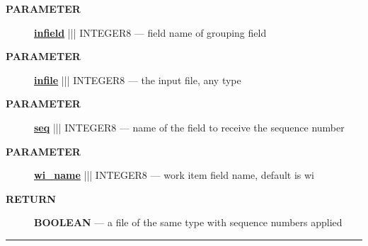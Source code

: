 \par
\begin{description}
\item [\colorbox{tagtype}{\color{white} \textbf{\textsf{PARAMETER}}}] \textbf{\underline{infield}} ||| INTEGER8 --- field name of grouping field
\item [\colorbox{tagtype}{\color{white} \textbf{\textsf{PARAMETER}}}] \textbf{\underline{infile}} ||| INTEGER8 --- the input file, any type
\item [\colorbox{tagtype}{\color{white} \textbf{\textsf{PARAMETER}}}] \textbf{\underline{seq}} ||| INTEGER8 --- name of the field to receive the sequence number
\item [\colorbox{tagtype}{\color{white} \textbf{\textsf{PARAMETER}}}] \textbf{\underline{wi\_name}} ||| INTEGER8 --- work item field name, default is wi
\end{description}







\par
\begin{description}
\item [\colorbox{tagtype}{\color{white} \textbf{\textsf{RETURN}}}] \textbf{BOOLEAN} --- a file of the same type with sequence numbers applied
\end{description}




\rule{\linewidth}{0.5pt}
